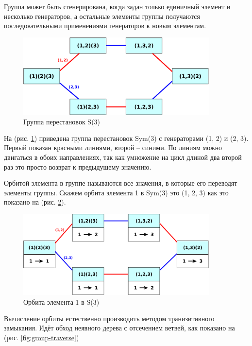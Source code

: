 \documentclass[a4paper,12pt,oneside]{book}
\begin{document}
Группа может быть сгенерирована, когда задан только единичный элемент и несколько генераторов, а остальные элементы группы получаются последовательными применениями генераторов к новым элементам.

\begin{figure}[ht]
\centering
\includegraphics[width=0.9\textwidth]{illustrations/group-base-crop.pdf}
\caption{Группа перестановок S(3)}
\label{fig:group_base}
\end{figure}

На (рис. \ref{fig:group_base}) приведена группа перестановок Sym(3) с генераторами (1, 2) и (2, 3). Первый показан красными линиями, второй -- синими. По линиям можно двигаться в обоих направлениях, так как умножение на цикл длиной два второй раз это просто возврат к предыдущему значению.

Орбитой элемента в группе называются все значения, в которые его переводят элементы группы. Скажем орбита элемента 1 в Sym(3) это (1, 2, 3) как это показано на (рис. \ref{fig:group-orbit}).

\begin{figure}[ht]
\centering
\includegraphics[width=0.9\textwidth]{illustrations/group-orbit-crop.pdf}
\caption{Орбита элемента 1 в S(3)}
\label{fig:group-orbit}
\end{figure}

Вычисление орбиты естественно производить методом транизитивного замыкания. Идёт обход неявного дерева с отсечением ветвей, как показано на (рис. \ref{fig:group-traverse})
\end{document}
